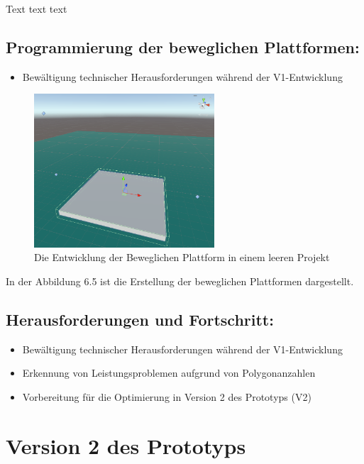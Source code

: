 Text text text

\pagebreak

\subsection{Programmierung der beweglichen Plattformen:}
\begin{itemize}
  \item Bewältigung technischer Herausforderungen während der V1-Entwicklung
\end{itemize}

\begin{figure}[h]
  \centering
  \includegraphics*[width=0.6\textwidth]{chapters/04/images/V1/MovingPlatformV1.png}
  \caption{Die Entwicklung der Beweglichen Plattform in einem leeren Projekt}
  \label{fig:PE04}
\end{figure}

In der Abbildung 6.5 ist die Erstellung der beweglichen Plattformen dargestellt. 

\subsection{Herausforderungen und Fortschritt:}
\begin{itemize}
  \item Bewältigung technischer Herausforderungen während der V1-Entwicklung
  \item Erkennung von Leistungsproblemen aufgrund von Polygonanzahlen
  \item Vorbereitung für die Optimierung in Version 2 des Prototyps (V2)
\end{itemize}


\pagebreak

\section{Version 2 des Prototyps}

